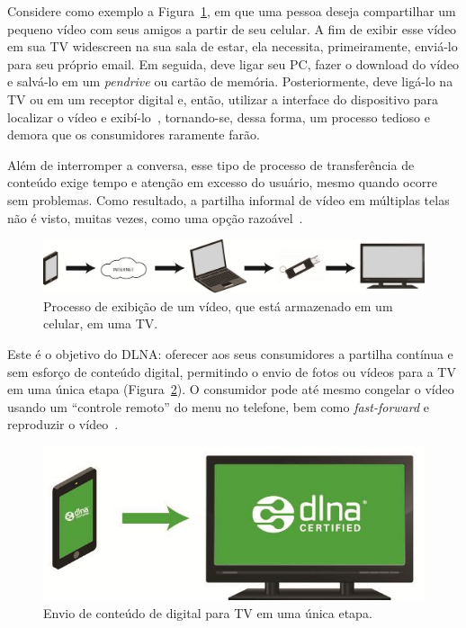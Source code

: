 Considere como exemplo a Figura~\ref{fig:traditionalProccess}, em que uma pessoa deseja compartilhar um pequeno vídeo com seus amigos a partir de seu celular. A fim de exibir esse vídeo em sua TV widescreen na sua sala de estar, ela necessita, primeiramente, enviá-lo para seu próprio email. Em seguida, deve ligar seu PC, fazer o download do vídeo e salvá-lo em um \emph{pendrive} ou cartão de memória. Posteriormente, deve ligá-lo na TV ou em um receptor digital e, então, utilizar a interface do dispositivo para localizar o vídeo e exibí-lo~\cite{dlnahdvideostreaming}, tornando-se, dessa forma, um processo tedioso e demora que os consumidores raramente farão.

Além de interromper a conversa, esse tipo de processo de transferência de conteúdo exige tempo e atenção em excesso do usuário, mesmo quando ocorre sem problemas. Como resultado, a partilha informal de vídeo em múltiplas telas não é visto, muitas vezes, como uma opção razoável~\cite{dlnahdvideostreaming}.

\begin{figure}[ht]
	\center
	\includegraphics[scale=0.3]{imagens/dlna1}
	\caption{Processo de exibição de um vídeo, que está armazenado em um celular, em uma TV.}
	\label{fig:traditionalProccess}
\end{figure}

Este é o objetivo do DLNA: oferecer aos seus consumidores a partilha contínua e sem esforço de conteúdo digital, permitindo o envio de fotos ou vídeos para a TV em uma única etapa (Figura~\ref{fig:dlnaProccess}). O consumidor pode até mesmo congelar o vídeo usando um ``controle remoto'' do menu no telefone, bem como \emph{fast-forward} e reproduzir o vídeo~\cite{dlnahdvideostreaming}.

\begin{figure}[ht]
	\center
	\includegraphics[scale=0.3]{imagens/dlna2}
	\caption{Envio de conteúdo de digital para TV em uma única etapa.}
	\label{fig:dlnaProccess}
\end{figure}

